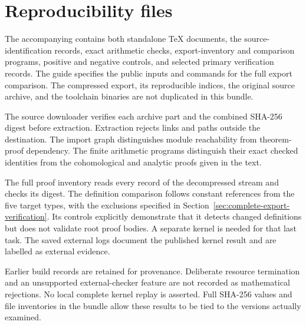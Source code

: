 \documentclass[11pt,a4paper]{article}
\theoremstyle{remark}
\begin{document}
\appendix
\section{Reproducibility files}
The accompanying  contains both
standalone TeX documents, the source-identification records, exact
arithmetic checks, export-inventory and comparison programs, positive
and negative controls, and selected primary verification records.
The guide  specifies the public inputs
and commands for the full export comparison. The compressed export,
its reproducible indices, the original source archive, and the
toolchain binaries are not duplicated in this bundle.

The source downloader verifies each archive part and the combined
SHA-256 digest before extraction. Extraction rejects links and paths
outside the destination. The import graph distinguishes module
reachability from theorem-proof dependency. The finite arithmetic
programs distinguish their exact checked identities from the
cohomological and analytic proofs given in the text.

The full proof inventory reads every record of the decompressed
stream and checks its digest. The definition comparison follows
constant references from the five target types, with the exclusions
specified in Section~\ref{sec:complete-export-verification}. Its
controls explicitly demonstrate that it detects changed definitions
but does not validate root proof bodies. A separate kernel is needed
for that last task. The saved external logs document the published
kernel result and are labelled as external evidence.

Earlier build records are retained for provenance. Deliberate resource
termination and an unsupported external-checker feature are not
recorded as mathematical rejections. No local complete kernel replay
is asserted. Full SHA-256 values and file inventories in the bundle
allow these results to be tied to the versions actually examined.
\end{document}
